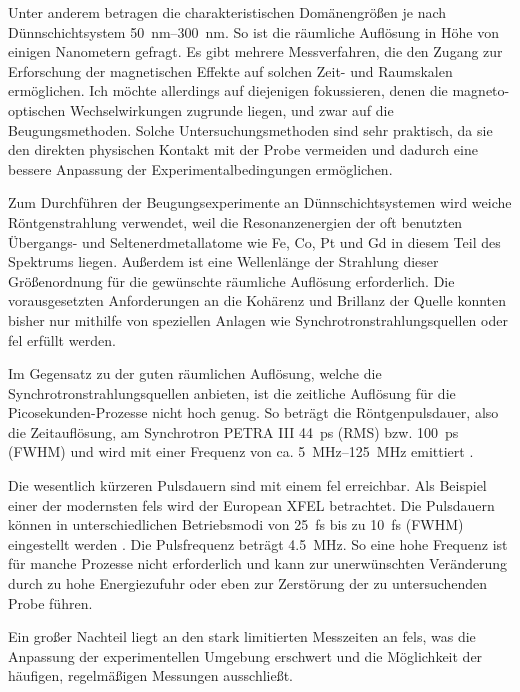 \noindent
Unter anderem betragen die charakteristischen Domänengrößen je nach Dünnschichtsystem \SIrange[range-units = single]{50}{300}{\nano\meter}. So ist die räumliche Auflösung in Höhe von einigen Nanometern gefragt. Es gibt mehrere Messverfahren, die den Zugang zur Erforschung der magnetischen Effekte auf solchen Zeit- und Raumskalen ermöglichen. Ich möchte allerdings auf diejenigen fokussieren, denen die magneto-optischen Wechselwirkungen zugrunde liegen, und zwar auf die Beugungsmethoden. Solche Untersuchungsmethoden sind sehr praktisch, da sie den direkten physischen Kontakt mit der Probe vermeiden und dadurch eine bessere Anpassung der Experimentalbedingungen ermöglichen.

\noindent
Zum Durchführen der Beugungsexperimente an Dünnschichtsystemen wird weiche Röntgenstrahlung verwendet, weil die Resonanzenergien der oft benutzten Übergangs- und Seltenerdmetallatome wie Fe, Co, Pt und Gd in diesem Teil des Spektrums liegen. Außerdem ist eine Wellenlänge der Strahlung dieser Größenordnung für die gewünschte räumliche Auflösung erforderlich. Die vorausgesetzten Anforderungen an die Kohärenz und Brillanz der Quelle konnten bisher nur mithilfe von speziellen Anlagen wie Synchrotronstrahlungsquellen oder \gls{fel} erfüllt werden.  %

\noindent
Im Gegensatz zu der guten räumlichen Auflösung, welche die Synchrotronstrahlungsquellen anbieten, ist die zeitliche Auflösung für die Picosekunden-Prozesse nicht hoch genug. So beträgt die Röntgenpulsdauer, also die Zeitauflösung, am Synchrotron PETRA III \SI{44}{\pico\second} (RMS) bzw. \SI{100}{\pico\second} (FWHM) und wird mit einer Frequenz von ca. \SIrange[range-units = single]{5}{125}{\mega\hertz} emittiert \cite{noauthor_machine_nodate}.

\noindent
Die wesentlich kürzeren Pulsdauern sind mit einem \gls{fel} erreichbar. Als Beispiel einer der mo\-dern\-sten \gls{fel}s wird der European XFEL betrachtet. Die Pulsdauern können in unterschiedlichen Betriebsmodi von \SI{25}{\femto\second} bis zu \SI{10}{\femto\second} (FWHM) eingestellt werden \cite{tschentscher_photon_2017}. Die Pulsfrequenz beträgt \SI{4,5}{\mega\hertz}. So eine hohe Frequenz ist für manche Prozesse nicht erforderlich und kann zur unerwünschten Veränderung durch zu hohe Energiezufuhr oder eben zur Zerstörung der zu untersuchenden Probe führen. 

\noindent
Ein großer Nachteil liegt an den stark limitierten Messzeiten an \gls{fel}s, was die Anpassung der experimentellen Umgebung erschwert und die Möglichkeit der häufigen, regelmäßigen Messungen ausschließt.

